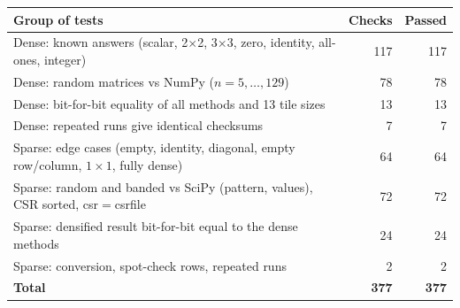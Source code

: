 \begin{tabular}{lrr}
\toprule
Group of tests & Checks & Passed \\
\midrule
Dense: known answers (scalar, 2$\times$2, 3$\times$3, zero, identity, all-ones, integer) & 117 & 117 \\
Dense: random matrices vs NumPy ($n=5,\dots,129$) & 78 & 78 \\
Dense: bit-for-bit equality of all methods and 13 tile sizes & 13 & 13 \\
Dense: repeated runs give identical checksums & 7 & 7 \\
Sparse: edge cases (empty, identity, diagonal, empty row/column, $1\times1$, fully dense) & 64 & 64 \\
Sparse: random and banded vs SciPy (pattern, values), CSR sorted, csr$=$csrfile & 72 & 72 \\
Sparse: densified result bit-for-bit equal to the dense methods & 24 & 24 \\
Sparse: conversion, spot-check rows, repeated runs & 2 & 2 \\
\midrule
\textbf{Total} & \textbf{377} & \textbf{377} \\
\bottomrule
\end{tabular}
